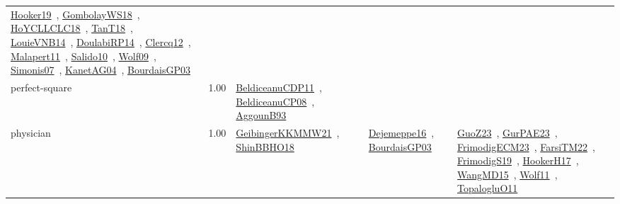 {\begin{longtable}{p{3cm}r>{\raggedright\arraybackslash}p{6cm}>{\raggedright\arraybackslash}p{6cm}>{\raggedright\arraybackslash}p{8cm}}
\href{../works/Hooker19.pdf}{Hooker19}~\cite{Hooker19}, \href{../works/GombolayWS18.pdf}{GombolayWS18}~\cite{GombolayWS18}, \href{../works/HoYCLLCLC18.pdf}{HoYCLLCLC18}~\cite{HoYCLLCLC18}, \href{../works/TanT18.pdf}{TanT18}~\cite{TanT18}, \href{../works/LouieVNB14.pdf}{LouieVNB14}~\cite{LouieVNB14}, \href{../works/DoulabiRP14.pdf}{DoulabiRP14}~\cite{DoulabiRP14}, \href{../works/Clercq12.pdf}{Clercq12}~\cite{Clercq12}, \href{../works/Malapert11.pdf}{Malapert11}~\cite{Malapert11}, \href{../works/Salido10.pdf}{Salido10}~\cite{Salido10}, \href{../works/Wolf09.pdf}{Wolf09}~\cite{Wolf09}, \href{../works/Simonis07.pdf}{Simonis07}~\cite{Simonis07}, \href{../works/KanetAG04.pdf}{KanetAG04}~\cite{KanetAG04}, \href{../works/BourdaisGP03.pdf}{BourdaisGP03}~\cite{BourdaisGP03}\\
\index{perfect-square}\index{ApplicationAreas!perfect-square}perfect-square &  1.00 & \href{../works/BeldiceanuCDP11.pdf}{BeldiceanuCDP11}~\cite{BeldiceanuCDP11}, \href{../works/BeldiceanuCP08.pdf}{BeldiceanuCP08}~\cite{BeldiceanuCP08}, \href{../works/AggounB93.pdf}{AggounB93}~\cite{AggounB93} &  & \\
\index{physician}\index{ApplicationAreas!physician}physician &  1.00 & \href{../works/GeibingerKKMMW21.pdf}{GeibingerKKMMW21}~\cite{GeibingerKKMMW21}, \href{../works/ShinBBHO18.pdf}{ShinBBHO18}~\cite{ShinBBHO18} & \href{../works/Dejemeppe16.pdf}{Dejemeppe16}~\cite{Dejemeppe16}, \href{../works/BourdaisGP03.pdf}{BourdaisGP03}~\cite{BourdaisGP03} & \href{../works/GuoZ23.pdf}{GuoZ23}~\cite{GuoZ23}, \href{../works/GurPAE23.pdf}{GurPAE23}~\cite{GurPAE23}, \href{../works/FrimodigECM23.pdf}{FrimodigECM23}~\cite{FrimodigECM23}, \href{../works/FarsiTM22.pdf}{FarsiTM22}~\cite{FarsiTM22}, \href{../works/FrimodigS19.pdf}{FrimodigS19}~\cite{FrimodigS19}, \href{../works/HookerH17.pdf}{HookerH17}~\cite{HookerH17}, \href{../works/WangMD15.pdf}{WangMD15}~\cite{WangMD15}, \href{../works/Wolf11.pdf}{Wolf11}~\cite{Wolf11}, \href{../works/TopalogluO11.pdf}{TopalogluO11}~\cite{TopalogluO11}\\

\end{longtable}}
